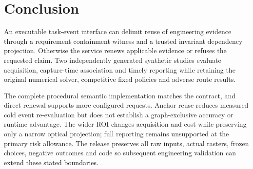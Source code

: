 \section{Conclusion}
An executable task-event interface can delimit reuse of engineering evidence through a requirement containment witness and a trusted invariant dependency projection. Otherwise the service renews applicable evidence or refuses the requested claim. Two independently generated synthetic studies evaluate acquisition, capture-time association and timely reporting while retaining the original numerical solver, competitive fixed policies and adverse route results.

The complete procedural semantic implementation matches the contract, and direct renewal supports more configured requests. Anchor reuse reduces measured cold event re-evaluation but does not establish a graph-exclusive accuracy or runtime advantage. The wider ROI changes acquisition and cost while preserving only a narrow optical projection; full reporting remains unsupported at the primary risk allowance. The release preserves all raw inputs, actual rasters, frozen choices, negative outcomes and code so subsequent engineering validation can extend these stated boundaries.
